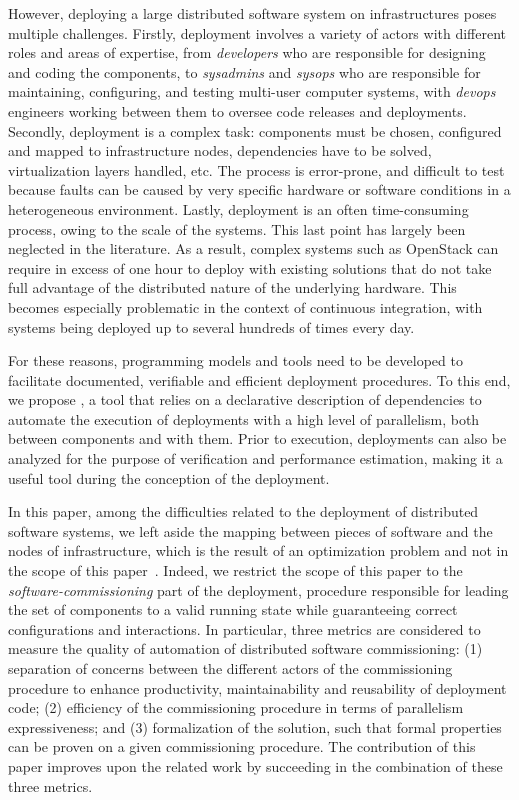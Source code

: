 However, deploying a large distributed software system on
infrastructures poses multiple challenges. Firstly, deployment
involves a variety of actors with different roles and areas of
expertise, from \emph{developers} who are responsible for designing
and coding the components, to \emph{sysadmins} and \emph{sysops} who
are responsible for maintaining, configuring, and testing multi-user
computer systems, with \emph{devops} engineers working between them to
oversee code releases and deployments. Secondly, deployment is a
complex task: components must be chosen, configured and mapped to
infrastructure nodes, dependencies have to be solved, virtualization
layers handled, etc. The process is error-prone, and difficult to test
because faults can be caused by very specific hardware or software
conditions in a heterogeneous environment. Lastly, deployment is an
often time-consuming process, owing to the scale of the systems. This
last point has largely been neglected in the literature. As a result,
complex systems such as OpenStack can require in excess of one hour to
deploy with existing solutions that do not take full advantage of the
distributed nature of the underlying hardware. This becomes especially
problematic in the context of continuous integration, with systems
being deployed up to several hundreds of times every day.

For these reasons, programming models and tools need to be developed
to facilitate documented, verifiable and efficient deployment
procedures. To this end, we propose \mad, a tool that relies on a
declarative description of dependencies to automate the execution of
deployments with a high level of parallelism, both between components
and with them. Prior to execution, \mad deployments can also be
analyzed for the purpose of verification and performance estimation,
making it a useful tool during the conception of the deployment.

In this paper, among the difficulties related to the deployment of
distributed software systems, we left aside the mapping between pieces
of software and the nodes of infrastructure, which is the result of an
optimization problem and not in the scope of this paper~\cite{6409358,
  10.1007/978-3-319-47677-3_15, cadorel:hal-02165835, ccgridemile,
  10.5555/2432523.2432528}. Indeed, we restrict the scope of this
paper to the \emph{software-commissioning} part of the deployment, \ie
procedure responsible for leading the set of components to a valid
running state while guaranteeing correct configurations and
interactions.  In particular, three metrics are considered to measure
the quality of automation of distributed software commissioning: (1)
separation of concerns between the different actors of the
commissioning procedure to enhance productivity, maintainability and
reusability of deployment code; (2) efficiency of the commissioning
procedure in terms of parallelism expressiveness; and (3)
formalization of the solution, such that formal properties can be
proven on a given commissioning procedure. The contribution of this
paper improves upon the related work by succeeding in the combination
of these three metrics.

